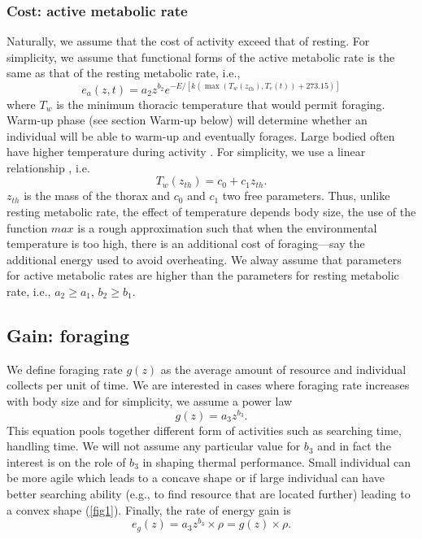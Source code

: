 \subsubsection*{Cost: active metabolic rate}
Naturally, we assume that the cost of activity exceed that of resting. 
For simplicity, we assume that functional forms of the active metabolic rate is the same as that of the resting metabolic rate, i.e., %
\begin{equation} \label{eq:ea}
	e_a(z,t) = a_2 z^{b_2}  e^{-E/[k (\max(T_w(z_{th}), T_e(t))+ 273.15)]}
\end{equation}
where $T_w$ is the minimum thoracic temperature that would permit foraging.
Warm-up phase (see section Warm-up below) will determine whether an individual will be able to warm-up and eventually forages.
Large bodied often have higher temperature during activity \citep{Bartholomew1977a}.
For simplicity, we use a linear relationship \citep{Bartholomew1977a}, i.e.
\begin{equation} \label{eq:Tw}
	T_w(z_{th}) = c_0+ c_1 z_{th}.
\end{equation}
$z_{th}$ is the mass of the thorax and $c_0$ and $c_1$ two free parameters.
Thus, unlike resting metabolic rate, the effect of temperature depends body size, the use of the function $max$ is a rough approximation such that when the environmental temperature is too high, there is an additional cost of foraging---say the additional energy used to avoid overheating. 
We alway assume that parameters for active metabolic rates are higher than the parameters for resting metabolic rate, i.e.,   $a_2 \geq a_1$, $b_2 \geq b_1$.

\subsection*{Gain: foraging}
We define foraging rate $g(z)$ as the average amount of resource and individual collects per unit of time.
We are interested in cases where foraging rate increases with body size and for simplicity, we assume a power law 
\[
	g(z) = a_3 z^{b_3}.
\]
This equation pools together different form of activities such as searching time, handling time.
We will not assume any particular value for $b_3$ and in fact the interest is on the role of $b_3$ in shaping thermal performance.
Small individual can be more agile which leads to a concave shape or if large individual can have better searching ability (e.g., to find resource that are located further) leading to a convex shape (\cref{fig1}). 
Finally, the rate of energy gain is  
\begin{equation} \label{eq:eg}
	e_g(z) = a_3 z^{b_3} \times \rho  = g(z) \times \rho.
\end{equation}

